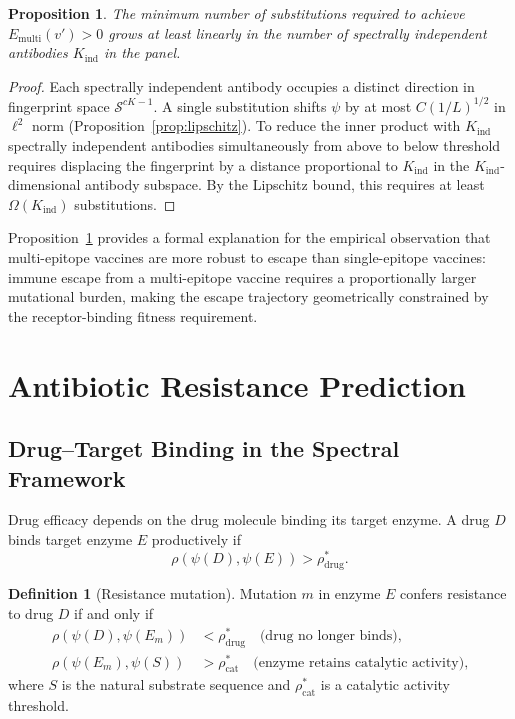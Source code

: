 \documentclass[twocolumn,11pt,a4paper]{article}
\newtheorem{proposition}[theorem]{Proposition}
\theoremstyle{definition}
\newtheorem{definition}[theorem]{Definition}
\theoremstyle{remark}
\begin{document}
\begin{proposition}
\label{prop:multiescape}
The minimum number of substitutions required to achieve
$E_{\text{multi}}(v') > 0$ grows at least linearly in the number of spectrally
independent antibodies $K_{\text{ind}}$ in the panel.
\end{proposition}

\begin{proof}
Each spectrally independent antibody occupies a distinct direction in fingerprint
space $\mathcal{S}^{cK-1}$. A single substitution shifts $\psi$ by at most
$C(1/L)^{1/2}$ in $\ell^2$ norm (Proposition~\ref{prop:lipschitz}). To reduce
the inner product with $K_{\text{ind}}$ spectrally independent antibodies
simultaneously from above to below threshold requires displacing the fingerprint
by a distance proportional to $K_{\text{ind}}$ in the $K_{\text{ind}}$-dimensional
antibody subspace. By the Lipschitz bound, this requires at least
$\Omega(K_{\text{ind}})$ substitutions.
\end{proof}

Proposition~\ref{prop:multiescape} provides a formal explanation for the
empirical observation that multi-epitope vaccines are more robust to escape than
single-epitope vaccines: immune escape from a multi-epitope vaccine requires a
proportionally larger mutational burden, making the escape trajectory
geometrically constrained by the receptor-binding fitness requirement.

\section{Antibiotic Resistance Prediction}
\label{sec:resistance}

\subsection{Drug--Target Binding in the Spectral Framework}

Drug efficacy depends on the drug molecule binding its target enzyme. A drug
$D$ binds target enzyme $E$ productively if
\begin{equation}
  \rho(\psi(D), \psi(E)) > \rho^*_{\text{drug}}.
  \label{eq:drug_binding}
\end{equation}

\begin{definition}[Resistance mutation]
\label{def:resistance}
Mutation $m$ in enzyme $E$ confers resistance to drug $D$ if and only if
\begin{align}
  \rho(\psi(D), \psi(E_m)) &< \rho^*_{\text{drug}}
    \quad\text{(drug no longer binds),}
  \label{eq:resist_a} \\
  \rho(\psi(E_m), \psi(S)) &> \rho^*_{\text{cat}}
    \quad\text{(enzyme retains catalytic activity),}
  \label{eq:resist_b}
\end{align}
where $S$ is the natural substrate sequence and $\rho^*_{\text{cat}}$ is a
catalytic activity threshold.
\end{definition}
\end{document}
